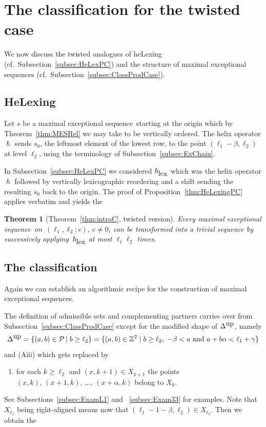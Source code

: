 \documentclass[11pt]{article}
\newtheorem{theorem}[theo]{Theorem}
\theoremstyle{definition}
\numberwithin{equation}{section}
\newcommand{\cP}{\mathcal{P}}
\newcommand{\Z}{\mathbb Z}
\newcommand{\kst }{\,|\;}
\newcommand{\xa}{\alpha}
\newcommand{\xb}{\beta}
\newcommand{\xc}{{\gamma}}
\newcommand{\cl}{s}
\newcommand{\DeltaUp}{\Delta^{\mbox{\tiny up}}}
\newcommand{\mes}{maximal exceptional sequence}
\newcommand{\helix}{\hslash}
\newcommand{\heLex}{\helix_{\mbox{\tiny lex}}}
\newcommand{\ssect}[1]{Subsection~\ref{#1}}
\newcommand{\ssects}[1]{Subsections~\ref{#1}}
\newcommand{\thHelex}{\ref{thm:introC}}
\begin{document}
\section{The classification for the twisted case}
\label{sec:completeClass}
We now discuss the twisted analogues of
heLexing (cf.\ \ssect{subsec:HeLexPC}) and 
the structure of {\mes}s (cf.\ \ssect{subsec:ClassProdCase}).

\subsection{HeLexing}
\label{subsec:HeLexing}
{Let $\cl$ be a \mes\ starting at 
the origin which by Theorem~\ref{thm:MESRel} we may 
take to be vertically ordered.} 
The helix operator $\helix$ sends $\cl_0$, the 
leftmost element of the lowest row, to the point
$(\ell_1-\xb,\ell_2)$ at level $\ell_2$,
using the terminology of \ssect{subsec:ExChain}.

In \ssect{subsec:HeLexPC} we considered
$\heLex$ which was the helix operator $\helix$ followed by 
vertically lexicographic reordering and a shift sending the 
resulting $\cl_0$ back to the origin. The proof of
Proposition~\ref{thm:HeLexingPC} applies verbatim 
and yields the

\begin{theorem}[Theorem~\thHelex, twisted version]
\label{thm:HeLexing}
Every \mes\ on~$(\ell_1,\ell_2;c)$, $c\not=0$, can be 
transformed into a trivial sequence by successively applying~$\heLex$ at most $\ell_1\ell_2$ times.
\end{theorem}

\subsection{The classification}
\label{subsec:mesClassification}
Again we can establish an algorithmic recipe 
for the construction of \mes s.

The definition of admissible sets and 
complementing partners carries over from 
\ssect{subsec:ClassProdCase} except for 
{the modified shape of $\DeltaUp$, namely
$$
\DeltaUp=\{(a,b)\in\cP\kst b\geq\ell_2\}
=\{(a,b)\in\Z^2\mid b\geq\ell_2,\; -\xb<a
\mbox{ and }a+b\xa<\ell_1+\xc\}
$$
and}
(Aiii) which gets replaced by
\begin{enumerate}
\item[(Aiii')]
for each $k\geq\ell_2$ and $(x,k+1)\in X_{k+1}$ 
the points $(x,k),\,(x+1,k),\,\ldots,\,(x+\xa,k)$
belong to $X_k$.
\end{enumerate}
See \ssects{subsec:ExamL1} and 
~\ref{subsec:Exam33} for examples. 
{Note that $X_{\ell_2}$ being right-aligned 
means now that $(\ell_1-1-\xb,\ell_2)\in X_{\ell_2}$.}
Then we obtain the
\end{document}
